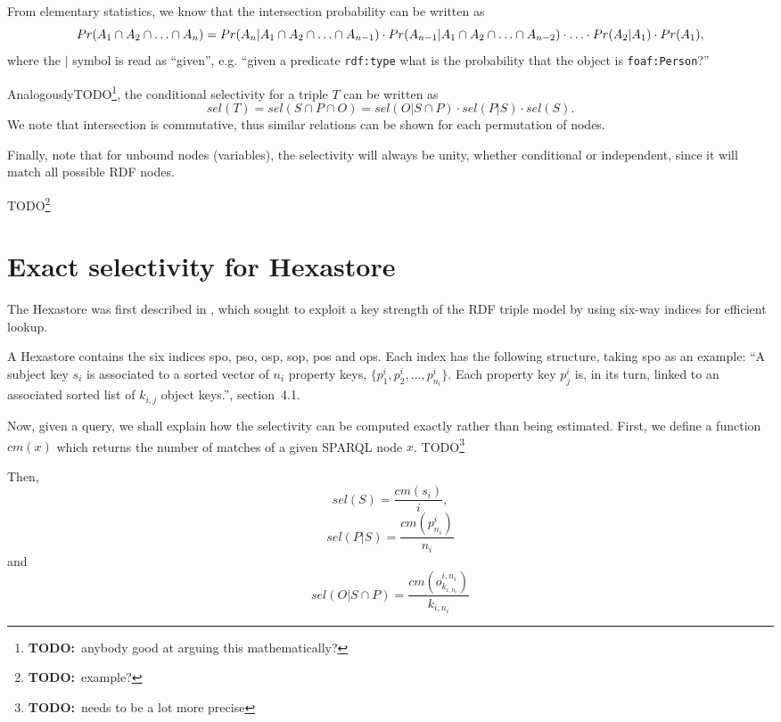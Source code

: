\documentclass[12pt, draft]{article}
\newcommand{\rdfnode}[1]{\texttt{#1}}
\newcommand{\todo}[1]{\tiny{TODO}\normalsize\footnote{\textbf{TODO:}~#1}}
\begin{document}
From elementary statistics, we know that the intersection probability
can be written as
\begin{equation}
Pr(A_1 \cap A_2  \cap \ldots \cap A_n) = 
  Pr(A_n | A_1 \cap A_2  \cap \ldots \cap A_{n-1}) \\
  \cdot Pr(A_{n-1} | A_1 \cap A_2  \cap \ldots \cap A_{n-2}) 
  \cdot \ldots \cdot Pr(A_2 | A_1) \cdot Pr(A_1) ,
\end{equation}
where the $|$ symbol is read as ``given'', e.g. ``given a predicate
\rdfnode{rdf:type} what is the probability that the object is \rdfnode{foaf:Person}?''

Analogously\todo{anybody good at arguing this mathematically?}, the conditional selectivity for a triple $T$ can be written as 
\begin{equation}
sel(T) = sel(S \cap P \cap O) = sel(O | S \cap P) \cdot sel(P | S)
\cdot sel(S) . 
\end{equation}
We note that intersection is commutative, thus similar
relations can be shown for each permutation of nodes.

Finally, note that for unbound nodes (variables), the selectivity will
always be unity, whether conditional or independent, since it will
match all possible RDF nodes. 

\todo{example?}

\section{Exact selectivity for Hexastore}

The Hexastore was first described in
\cite{Weiss:2008:HSI:1453856.1453965}, which sought to exploit a key
strength of the RDF triple model by using six-way indices for
efficient lookup.

A Hexastore contains the six indices \textsf{spo}, \textsf{pso},
\textsf{osp}, \textsf{sop}, \textsf{pos} and \textsf{ops}. Each index
has the following structure, taking \textsf{spo} as an example: ``A
subject key $s_i$ is associated to a sorted vector of $n_i$ property
keys, $\{p_1^i , p_2^i , \ldots , p^i_{n_i} \}$. Each property key $p_j^i$
is, in its turn, linked to an associated sorted list of $k_{i,j}$
object keys.''\cite{Weiss:2008:HSI:1453856.1453965}, section~4.1.

Now, given a query, we shall explain how the selectivity can be
computed exactly rather than being estimated. First, we define a
function $cm(x)$ which returns the number of matches of a given SPARQL
node $x$. \todo{needs to be a lot more precise}

Then, 
\begin{equation}
sel(S) = \frac{cm(s_i)}{i} ,
\end{equation}
\begin{equation}
sel(P|S) = \frac{cm(p_{n_i}^i)}{n_i}
\end{equation}
and
\begin{equation}
sel(O|S \cap P) = \frac{cm(o_{k_{i,n_i}}^{i,n_i})}{k_{i,n_i}}
\end{equation}





\end{document}
